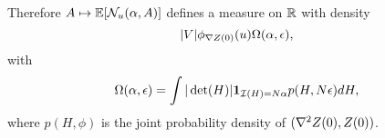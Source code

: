 \begin{remark}
	Therefore \(A\mapsto \mathbb{E}[\mathcal{N}_u(\alpha, A)]\) defines a measure on \(\mathbb{R}\)
	with density
	\begin{equation*}
		|V| \phi_{\nabla Z(0)}(u) \Omega(\alpha, \epsilon),
	\end{equation*}
	with
	\begin{equation*}
		\Omega(\alpha, \epsilon)
		= \int |\det(H)| \mathbf{1}_{\mathcal{I}(H) = N\alpha} p(H, N\epsilon)dH,
	\end{equation*}
	where \(p(H, \phi)\) is the joint probability density of \((\nabla^2Z(0), Z(0))\).
\end{remark}